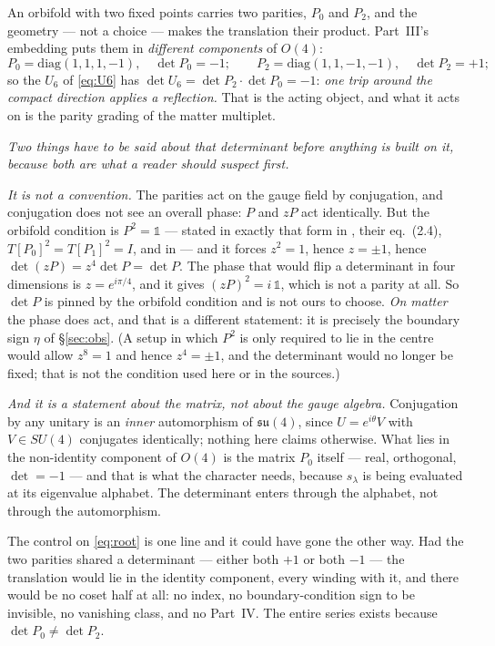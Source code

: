 \documentclass[11pt,a4paper]{article}
\newcommand{\one}{\mathds{1}}
\newcommand{\su}[1]{SU(#1)}
\begin{document}
An orbifold with two fixed points carries two parities, $P_0$ and $P_2$, and the geometry --- not a
choice --- makes the translation their product. Part~III's embedding puts them in \emph{different
components} of $O(4)$:
\begin{equation}\label{eq:root}
P_0=\mathrm{diag}(1,1,1,-1),\quad \det P_0=-1;
\qquad
P_2=\mathrm{diag}(1,1,-1,-1),\quad \det P_2=+1;
\end{equation}
so the $U_6$ of \eqref{eq:U6} has $\det U_6=\det P_2\cdot\det P_0=-1$: \emph{one trip around the
compact direction applies a
reflection.} That is the acting object, and what it acts on is the parity grading of the matter
multiplet.

\emph{Two things have to be said about that determinant before anything is built on it, because both
are what a reader should suspect first.}

\emph{It is not a convention.} The parities act on the gauge field by conjugation, and conjugation
does not see an overall phase: $P$ and $zP$ act identically. But the orbifold condition is
$P^2=\one$ --- stated in exactly that form in \cite{HHK}, their eq.~(2.4),
$T[P_0]^2=T[P_1]^2=I$, and in \cite{KKKY} --- and it forces $z^2=1$, hence $z=\pm1$, hence
$\det(zP)=z^4\det P=\det P$. The phase that would flip a determinant in four dimensions is
$z=e^{i\pi/4}$, and it gives $(zP)^2=i\,\one$, which is not a parity at all. So $\det P$ is
pinned by the orbifold condition and is not ours to choose. \emph{On matter} the phase does act, and
that is a different statement: it is precisely the boundary sign $\eta$ of \S\ref{sec:obs}. (A setup
in which $P^2$ is only required to lie in the centre would allow $z^8=1$ and hence $z^4=\pm1$, and
the determinant would no longer be fixed; that is not the condition used here or in the sources.)

\emph{And it is a statement about the matrix, not about the gauge algebra.} Conjugation by any
unitary is an \emph{inner} automorphism of $\mathfrak{su}(4)$, since $U=e^{i\theta}V$ with
$V\in\su4$ conjugates identically; nothing here claims otherwise. What lies in the non-identity
component of $O(4)$ is the matrix $P_0$ itself --- real, orthogonal, $\det=-1$ --- and that is what
the character needs, because $s_\lambda$ is being evaluated at its eigenvalue alphabet. The
determinant enters through the alphabet, not through the automorphism.

The control on \eqref{eq:root} is one line and it could have gone the other way. Had the two parities shared a
determinant --- either both $+1$ or both $-1$ --- the translation would lie in the identity
component, every winding with it, and there would be no coset half at all: no index, no
boundary-condition sign to be invisible, no vanishing class, and no Part~IV. The entire series exists
because $\det P_0\neq\det P_2$.
\end{document}
